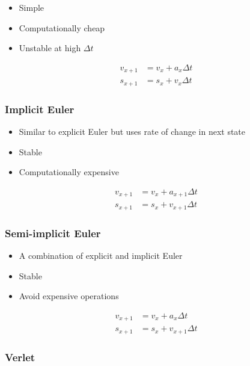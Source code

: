 \documentclass[a4paper]{article}
\begin{document}
\begin{itemize}
  \item Simple
  \item Computationally cheap
  \item Unstable at high $\Delta t$
\end{itemize}

\begin{align*}
  v_{x + 1} &= v_{x} + a_{x} \Delta t \\
  s_{x + 1} &= s_{x} + v_{x} \Delta t
\end{align*}

\subsubsection{Implicit Euler}

\begin{itemize}
  \item Similar to explicit Euler but uses rate of change in next state
  \item Stable
  \item Computationally expensive
\end{itemize}

\begin{align*}
  v_{x + 1} &= v_{x} + a_{x + 1} \Delta t \\
  s_{x + 1} &= s_{x} + v_{x + 1} \Delta t
\end{align*}

\subsubsection{Semi-implicit Euler}

\begin{itemize}
  \item A combination of explicit and implicit Euler
  \item Stable
  \item Avoid expensive operations
\end{itemize}

\begin{align*}
  v_{x + 1} &= v_{x} + a_{x} \Delta t \\
  s_{x + 1} &= s_{x} + v_{x + 1} \Delta t
\end{align*}

\subsubsection{Verlet}
\end{document}
